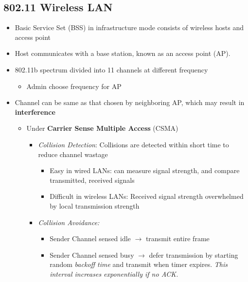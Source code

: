 \documentclass[a4paper]{article}
\begin{document}
\subsection{802.11 Wireless LAN}
\begin{itemize}
    \item Basic Service Set (BSS) in infrastructure mode consists of wireless hosts and access point
    \item Host communicates with a base station, known as an access point (AP).
    \item 802.11b spectrum divided into 11 channels at different frequency
    \begin{itemize}[label=$\circ$]
        \item Admin choose frequency for AP
    \end{itemize}
    \item Channel can be same as that chosen by neighboring AP, which may result in \textbf{interference}
    \begin{itemize}[label=$\circ$]
        \item Under \textbf{Carrier Sense Multiple Access} (CSMA)
        \begin{itemize}[label=\tiny$\blacksquare$]
            \item \textit{Collision Detection}: Collisions are detected within short time to reduce channel wastage
            \begin{itemize}[label=\tiny$\blacksquare$]
                \item Easy in wired LANs: can measure signal strength, and compare transmitted, received signals
                \item Difficult in wireless LANs: Received signal strength overwhelmed by local transmission strength
            \end{itemize}
            \item \textit{Collision Avoidance:}
            \begin{itemize}[label=\tiny$\blacksquare$]
                \item Sender Channel sensed idle $\rightarrow$ transmit entire frame
                \item Sender Channel sensed busy $\rightarrow$ defer transmission by starting random \textit{backoff time} and transmit when timer expires. \textit{This interval increases exponentially if no ACK.}
            \end{itemize}
        \end{itemize}
    \end{itemize}

\end{itemize}
\end{document}
